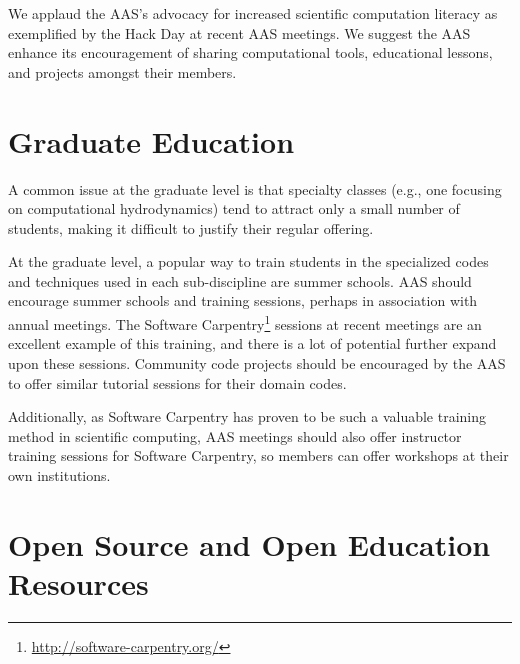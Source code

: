 \documentclass[11pt]{article}
\begin{document}
We applaud the AAS's advocacy for increased scientific computation
literacy as exemplified by the Hack Day at recent AAS meetings.  We
suggest the AAS enhance its encouragement of sharing computational
tools, educational lessons, and projects amongst their members.


%





\section{Graduate Education}

A common issue at the graduate level is that specialty classes (e.g.,
one focusing on computational hydrodynamics) tend to attract only a
small number of students, making it difficult to justify their regular
offering.

At the graduate level, a popular way to train students in the
specialized codes and techniques used in each sub-discipline are summer
schools.  AAS should encourage summer schools and training sessions,
perhaps in association with annual meetings.  The Software
Carpentry\footnote{\url{http://software-carpentry.org/}} sessions at
recent meetings are an excellent example of this training, and there is a lot of
potential further expand upon these sessions.  Community code projects should be
encouraged by the AAS to offer similar tutorial sessions for their domain
codes.

Additionally, as Software Carpentry has proven to be such a valuable
training method in scientific computing, AAS meetings should also
offer instructor training sessions for Software Carpentry, so members
can offer workshops at their own institutions.


\section{Open Source and Open Education Resources}
\end{document}

